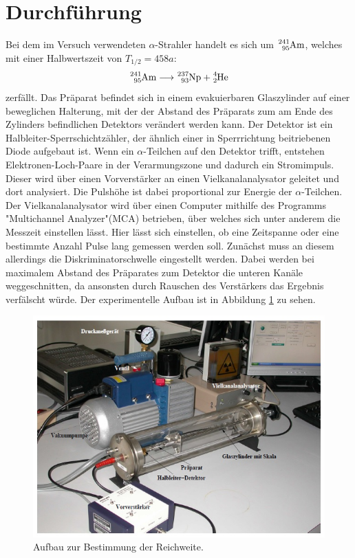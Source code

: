 \section{Durchführung}
\label{sec:Durchführung}
Bei dem im Versuch verwendeten $\alpha$-Strahler handelt es sich um $\ce{^241_95\text{Am}}$, welches mit einer Halbwertszeit von $T_{1/2} = 458 a$:
\begin{equation*}
\ce{^241_95\text{Am}} \longrightarrow \ce{^237_93\text{Np}} + \ce{^4_2\text{He}}
\end{equation*}
zerfällt. Das Präparat befindet sich in einem evakuierbaren Glaszylinder auf einer beweglichen Halterung, mit der der Abstand des Präparats zum am Ende des Zylinders befindlichen Detektors verändert werden kann. Der Detektor ist ein Halbleiter-Sperrschichtzähler, der ähnlich einer in Sperrrichtung beitriebenen Diode aufgebaut ist. Wenn ein $\alpha$-Teilchen auf den Detektor trifft, entstehen Elektronen-Loch-Paare in der Verarmungszone und dadurch ein Stromimpuls. Dieser wird über einen Vorverstärker an einen Vielkanalanalysator geleitet und dort analysiert. Die Pulshöhe ist dabei proportional zur Energie der $\alpha$-Teilchen. Der Vielkanalanalysator wird über einen Computer mithilfe des Programms "Multichannel Analyzer"(MCA) betrieben, über welches sich unter anderem die Messzeit einstellen lässt. Hier lässt sich einstellen, ob eine Zeitspanne oder eine bestimmte Anzahl Pulse lang gemessen werden soll. Zunächst muss an diesem allerdings die Diskriminatorschwelle eingestellt werden. Dabei werden bei maximalem Abstand des Präparates zum Detektor die unteren Kanäle weggeschnitten, da ansonsten durch Rauschen des Verstärkers das Ergebnis verfälscht würde. Der experimentelle Aufbau ist in Abbildung \ref{fig:aufbau} zu sehen. 

\begin{figure}[h!]
	\centering
	\includegraphics[width=0.8\linewidth]{Aufbau.jpg}
	\caption{Aufbau zur Bestimmung der Reichweite.\cite[3]{anleitung701}}
	\label{fig:aufbau}
\end{figure}

